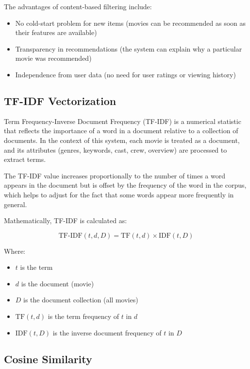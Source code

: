 \documentclass[12pt,a4paper]{article}
\begin{document}
The advantages of content-based filtering include:

\begin{itemize}
    \item No cold-start problem for new items (movies can be recommended as soon as their features are available)
    \item Transparency in recommendations (the system can explain why a particular movie was recommended)
    \item Independence from user data (no need for user ratings or viewing history)
\end{itemize}

\subsection{TF-IDF Vectorization}

Term Frequency-Inverse Document Frequency (TF-IDF) is a numerical statistic that reflects the importance of a word in a document relative to a collection of documents. In the context of this system, each movie is treated as a document, and its attributes (genres, keywords, cast, crew, overview) are processed to extract terms.

The TF-IDF value increases proportionally to the number of times a word appears in the document but is offset by the frequency of the word in the corpus, which helps to adjust for the fact that some words appear more frequently in general.

Mathematically, TF-IDF is calculated as:

\begin{equation}
    \text{TF-IDF}(t, d, D) = \text{TF}(t, d) \times \text{IDF}(t, D)
\end{equation}

Where:
\begin{itemize}
    \item $t$ is the term
    \item $d$ is the document (movie)
    \item $D$ is the document collection (all movies)
    \item $\text{TF}(t, d)$ is the term frequency of $t$ in $d$
    \item $\text{IDF}(t, D)$ is the inverse document frequency of $t$ in $D$
\end{itemize}

\subsection{Cosine Similarity}
\end{document}
